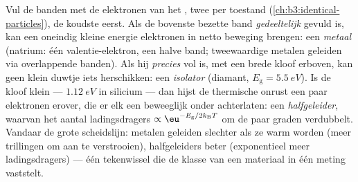 \begin{definition}\label{def:b3:electrons-in-solids:classes}
Vul de banden met de elektronen van het , twee per toestand
(\cref{ch:b3:identical-particles}), de koudste eerst. Als de bovenste
bezette band \emph{gedeeltelijk} gevuld is, kan een oneindig kleine energie
elektronen in netto beweging brengen: een \emph{metaal} (natrium: één
valentie-elektron, een halve band; tweewaardige metalen geleiden via
overlappende banden). Als hij \emph{precies} vol is, met een brede kloof
erboven, kan geen klein duwtje iets herschikken: een \emph{isolator}
(diamant, $E_{\text{g}} = \qty{5.5}{eV}$). Is de kloof klein ---
$\qty{1.12}{eV}$ in silicium --- dan hijst de thermische onrust een paar
elektronen erover, die er elk een beweeglijk \emph{} onder achterlaten: een
\emph{halfgeleider}, waarvan het aantal ladingsdragers
$\propto\eu^{-E_{\text{g}}/2k_{\text{B}}T}$ om de paar graden verdubbelt.
Vandaar de grote scheidslijn: metalen geleiden slechter als ze warm worden
(meer trillingen om aan te verstrooien), halfgeleiders beter
(exponentieel meer ladingsdragers) --- één tekenwissel die de klasse van een
materiaal in één meting vaststelt.
\end{definition}

